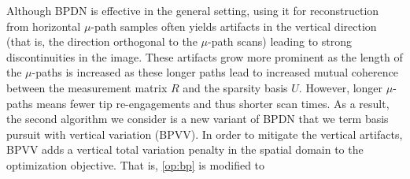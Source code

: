 \documentclass[twocolumn,twoside]{IEEEtran/IEEEtran}
\begin{document}
Although BPDN is effective in the general setting, using it for reconstruction
from horizontal $\mu$-path samples often yields artifacts in the vertical
direction (that is, the direction orthogonal to the $\mu$-path scans) leading to
strong discontinuities in the image. These artifacts grow more prominent as the
length of the $\mu$-paths is increased \cite{maxwell2014compressed} as these
longer paths lead to increased mutual coherence between the measurement matrix
$R$ and the sparsity basis $U$. However, longer $\mu$-paths means fewer
tip re-engagements and thus shorter scan times.
As a result, the second
algorithm we consider is a new variant of BPDN that we term basis pursuit with
vertical variation (BPVV). In order to mitigate the vertical artifacts, BPVV
adds a vertical total variation penalty in the spatial domain to the
optimization objective. That is, \eqref{op:bp} is modified to
\end{document}
